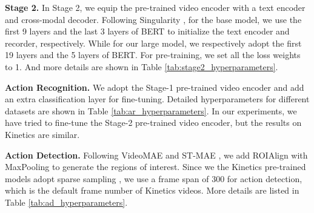\documentclass[10pt,twocolumn,letterpaper]{article}
\begin{document}
\textbf{Stage 2.}
In Stage 2,
we equip the pre-trained video encoder with a text encoder and cross-modal decoder.
Following Singularity \cite{lei2022revealing},
for the base model,
we use the first 9 layers and the last 3 layers of BERT to initialize the text encoder and recorder, respectively.
While for our large model,
we respectively adopt the first 19 layers and the 5 layers of BERT.
For pre-training,
we set all the loss weights to 1.
And more details are shown in Table \ref{tab:stage2_hyperparameters}.


\textbf{Action Recognition.}
We adopt the Stage-1 pre-trained video encoder and add an extra classification layer for fine-tuning.
Detailed hyperparameters for different datasets are shown in Table \ref{tab:ar_hyperparameters}.
In our experiments,
we have tried to fine-tune the Stage-2 pre-trained video encoder,
but the results on Kinetics are similar.

\textbf{Action Detection.}
Following VideoMAE \cite{videomae} and ST-MAE \cite{st_mae},
we add ROIAlign with MaxPooling to generate the regions of interest.
Since we the Kinetics pre-trained models adopt sparse sampling \cite{tsn},
we use a frame span of 300 for action detection,
which is the default frame number of Kinetics videos.
More details are listed in Table \ref{tab:ad_hyperparameters}.
\end{document}
